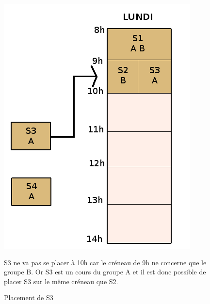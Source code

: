 \documentclass[12pt,a4paper,openany]{memoir}
\begin{document}
\begin{figure}[H]
   \begin{minipage}{0.35\linewidth}
      \includegraphics[scale=0.3]{img/Schema/Etape_3.png}
      \caption{Placement de S3}
   \end{minipage} \hfill
   \begin{minipage}[c]{0.64\linewidth}
    S3 ne va pas se placer à 10h car le créneau de 9h ne concerne que le groupe B. Or S3 est un cours du groupe A et il est donc possible de placer S3 sur le même créneau que S2.
   \end{minipage}
\end{figure}
\end{document}
